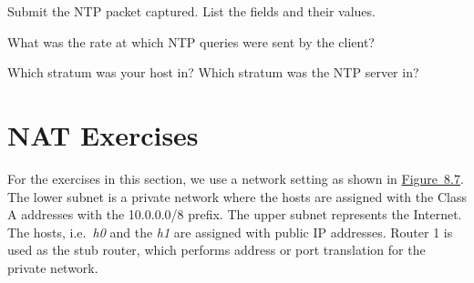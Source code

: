 \documentclass{../UTNetLab}
\begin{document}
    \begin{report}
        \item Submit the NTP packet captured.
            List the fields and their values.

        \item What was the rate at which NTP queries were sent by the client?

        \item Which stratum was your host in? Which stratum was the NTP server in?
    \end{report}

\part{NAT Exercises}
    For the exercises in this section, we use a network setting as shown in \hyperref[fig:8.7]{Figure~8.7}.
    The lower subnet is a private network where the hosts are assigned with the Class A addresses with the 10.0.0.0/8 prefix.
    The upper subnet represents the Internet.
    The hosts, i.e.\  \textit{h0} and the \textit{h1} are assigned with public IP addresses.
    Router 1 is used as the stub router, which performs address or port translation for the private network.
\end{document}
